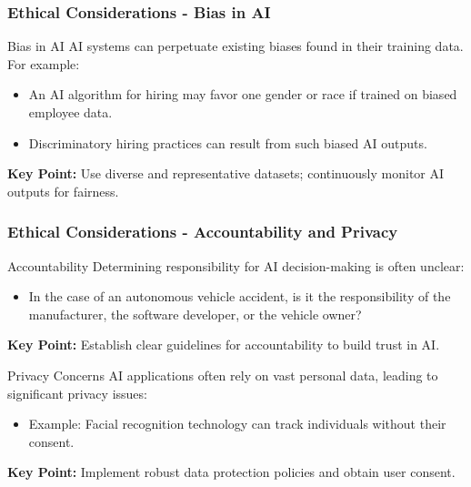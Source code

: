\documentclass[aspectratio=169]{beamer}
\begin{document}
\begin{frame}[fragile]
    \frametitle{Ethical Considerations - Bias in AI}
    \begin{block}{Bias in AI}
        AI systems can perpetuate existing biases found in their training data. For example:
    \end{block}
    \begin{itemize}
        \item An AI algorithm for hiring may favor one gender or race if trained on biased employee data.
        \item Discriminatory hiring practices can result from such biased AI outputs.
    \end{itemize}
    \textbf{Key Point:} Use diverse and representative datasets; continuously monitor AI outputs for fairness.
\end{frame}

\begin{frame}[fragile]
    \frametitle{Ethical Considerations - Accountability and Privacy}
    \begin{block}{Accountability}
        Determining responsibility for AI decision-making is often unclear:
    \end{block}
    \begin{itemize}
        \item In the case of an autonomous vehicle accident, is it the responsibility of the manufacturer, the software developer, or the vehicle owner?
    \end{itemize}
    \textbf{Key Point:} Establish clear guidelines for accountability to build trust in AI.

    \vspace{1cm}
    \begin{block}{Privacy Concerns}
        AI applications often rely on vast personal data, leading to significant privacy issues:
    \end{block}
    \begin{itemize}
        \item Example: Facial recognition technology can track individuals without their consent.
    \end{itemize}
    \textbf{Key Point:} Implement robust data protection policies and obtain user consent.
\end{frame}
\end{document}
